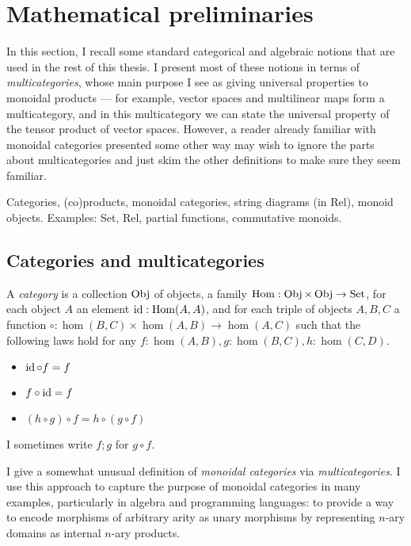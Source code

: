 \chapter{Mathematical preliminaries}

In this section, I recall some standard categorical and algebraic notions that
are used in the rest of this thesis.
I present most of these notions in terms of \emph{multicategories}, whose main
purpose I see as giving universal properties to monoidal products --- for
example, vector spaces and multilinear maps form a multicategory, and in this
multicategory we can state the universal property of the tensor product of
vector spaces.
However, a reader already familiar with monoidal categories presented some other
way may wish to ignore the parts about multicategories and just skim the other
definitions to make sure they seem familiar.

Categories, (co)products, monoidal categories, string diagrams (in Rel),
monoid objects.
Examples: Set, Rel, partial functions, commutative monoids.

\section{Categories and multicategories}

\begin{definition}
  A \emph{category} is a collection $\operatorname{Obj}$ of objects, a family
  $\operatorname{Hom} : \operatorname{Obj} \times \operatorname{Obj} \to \operatorname{Set}$, for each object $A$ an element
  $\operatorname{id} : \operatorname{Hom}(A,A)$, and for each triple of objects $A, B, C$ a function
  ${\circ} : \hom(B,C) \times \hom(A,B) \to \hom(A,C)$ such that the following
  laws hold for any $f : \hom(A,B), g : \hom(B,C), h : \hom(C,D)$.
  \begin{itemize}
    \item $\operatorname{id} \circ f = f$
    \item $f \circ \operatorname{id} = f$
    \item $(h \circ g) \circ f = h \circ (g \circ f)$
  \end{itemize}
  I sometimes write $f; g$ for $g \circ f$.
\end{definition}

I give a somewhat unusual definition of \emph{monoidal categories} via
\emph{multicategories}.
I use this approach to capture the purpose of monoidal categories in many
examples, particularly in algebra and programming languages: to provide a way to
encode morphisms of arbitrary arity as unary morphisms by representing $n$-ary
domains as internal $n$-ary products.

